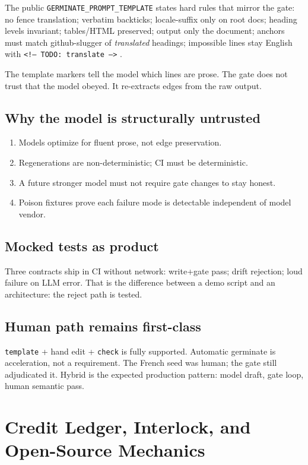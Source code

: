 \documentclass[11pt]{article}
\theoremstyle{definition}
\theoremstyle{plain}
\theoremstyle{remark}
\begin{document}
The public \texttt{GERMINATE\_PROMPT\_TEMPLATE} states hard rules that mirror
the gate: no fence translation; verbatim backticks; locale-suffix only on root
docs; heading levels invariant; tables/HTML preserved; output only the
document; anchors must match github-slugger of \emph{translated} headings;
impossible lines stay English with \texttt{<!-- TODO: translate -->}
\citep{hermespr80391}.

The template markers tell the model which lines are prose. The gate does not
trust that the model obeyed. It re-extracts edges from the raw output.

\subsection{Why the model is structurally untrusted}

\begin{enumerate}[leftmargin=*]
\item Models optimize for fluent prose, not edge preservation.
\item Regenerations are non-deterministic; CI must be deterministic.
\item A future stronger model must not require gate changes to stay honest.
\item Poison fixtures prove each failure mode is detectable independent of
  model vendor.
\end{enumerate}

\subsection{Mocked tests as product}

Three contracts ship in CI without network: write+gate pass; drift rejection;
loud failure on LLM error. That is the difference between a demo script and
an architecture: the reject path is tested.

\subsection{Human path remains first-class}

\texttt{template} + hand edit + \texttt{check} is fully supported. Automatic
germinate is acceleration, not a requirement. The French seed was human; the
gate still adjudicated it. Hybrid is the expected production pattern: model
draft, gate loop, human semantic pass.


\section{Credit Ledger, Interlock, and Open-Source Mechanics}
\label{sec:oss}
\end{document}
